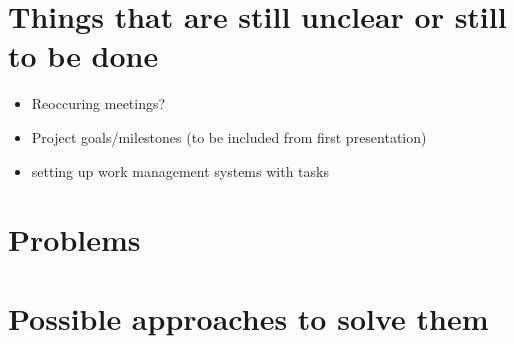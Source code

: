 \section{Things that are still unclear or still to be done}
\begin{itemize}
	\item Reoccuring meetings?
	\item Project goals/milestones (to be included from first presentation)
	\item setting up work management systems with tasks
\end{itemize}

\section{Problems}

\section{Possible approaches to solve them}


